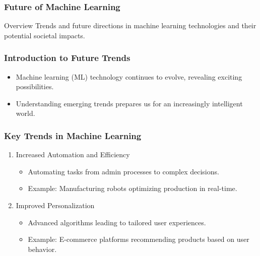 \documentclass[aspectratio=169]{beamer}
\begin{document}
\begin{frame}
  \frametitle{Future of Machine Learning}
  \begin{block}{Overview}
    Trends and future directions in machine learning technologies and their potential societal impacts.
  \end{block}
\end{frame}

\begin{frame}
  \frametitle{Introduction to Future Trends}
  \begin{itemize}
    \item Machine learning (ML) technology continues to evolve, revealing exciting possibilities.
    \item Understanding emerging trends prepares us for an increasingly intelligent world.
  \end{itemize}
\end{frame}

\begin{frame}
  \frametitle{Key Trends in Machine Learning}
  \begin{enumerate}
    \item Increased Automation and Efficiency
      \begin{itemize}
        \item Automating tasks from admin processes to complex decisions.
        \item Example: Manufacturing robots optimizing production in real-time.
      \end{itemize}
  
    \item Improved Personalization
      \begin{itemize}
        \item Advanced algorithms leading to tailored user experiences.
        \item Example: E-commerce platforms recommending products based on user behavior.
      \end{itemize}
  \end{enumerate}
\end{frame}
\end{document}
